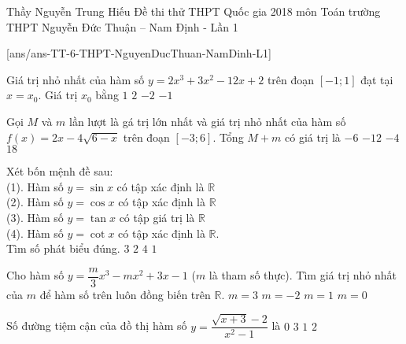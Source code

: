 \begin{name}
{Thầy Nguyễn Trung Hiếu}
{Đề thi thử THPT Quốc gia 2018 môn Toán trường THPT Nguyễn Đức Thuận – Nam Định - Lần 1}
\end{name}
\setcounter{ex}{0}
[ans/ans-TT-6-THPT-NguyenDucThuan-NamDinh-L1]
\begin{ex}%
Giá trị nhỏ nhất của hàm số $y=2x^3+3x^2-12x+2$	trên đoạn $[-1;1]$ đạt tại $x=x_0$. Giá trị $x_0$ bằng
	\choice
	{\True $1$}
	{$2$}
	{$-2$}
	{$-1$}
\end{ex}
\begin{ex}%
Gọi $M$ và $m$ lần lượt là gá trị lớn nhất và giá trị nhỏ nhất của hàm số $f(x)=2x-4\sqrt{6-x}$ trên đoạn $[-3;6]$. Tổng $M+m$ có giá trị là
	\choice
	{\True $-6$}
	{$-12$}
	{$-4$}
	{$18$}
\end{ex}
\begin{ex}%
Xét bốn mệnh đề sau:\\
(1). Hàm số $y=\sin x$ có tập xác định là $\mathbb{R}$\\
(2). Hàm số $y=\cos x$ có tập xác định là $\mathbb{R}$\\
(3). Hàm số $y=\tan x$ có tập giá trị là $\mathbb{R}$\\
(4). Hàm số $y=\cot x$ có tập xác định là $\mathbb{R}$.\\
Tìm số phát biểu đúng.
	\choice
	{\True $3$}
	{$2$}
	{$4$}
	{$1$}
\end{ex}
\begin{ex}%
Cho hàm số $y=\dfrac{m}{3}x^3-mx^2+3x-1$ ($m$ là tham số thực). Tìm giá trị nhỏ nhất của $m$ để hàm số trên luôn đồng biến trên $\mathbb{R}$.
	\choice
	{$m=3$}
	{$m=-2$}
	{$m=1$}
	{\True $m=0$}
\end{ex}
\begin{ex}%
Số đường tiệm cận của đồ thị hàm số $y=\dfrac{\sqrt{x+3}-2}{x^2-1}$ là
	\choice
	{$0$}
	{$3$}
	{$1$}
	{\True $2$}
\end{ex}

